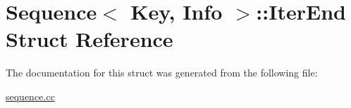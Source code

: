 \hypertarget{structSequence_1_1IterEnd}{}\section{Sequence$<$ Key, Info $>$\+::Iter\+End Struct Reference}
\label{structSequence_1_1IterEnd}


The documentation for this struct was generated from the following file\+:\begin{DoxyCompactItemize}
\item 
\mbox{\hyperlink{sequence_8cc}{sequence.\+cc}}\end{DoxyCompactItemize}
